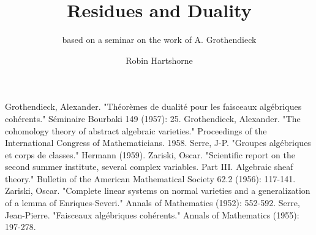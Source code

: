 \documentclass[graybox,envcountchap,sectrefs]{svmono}
\begin{document}
\author{Robin Hartshorne}
\title{Residues and Duality}
\subtitle{based on a seminar on the work of A. Grothendieck}
\maketitle

\frontmatter%

% 
% 

% 


\tableofcontents

% 


\mainmatter%
% 


% 
% 

\backmatter%

% 

\biblstarthook{}

\begin{thebibliography}{99.}%
%
%

 Grothendieck, Alexander. "Théorèmes de dualité pour les faisceaux algébriques cohérents." Séminaire Bourbaki 149 (1957): 25.
 Grothendieck, Alexander. "The cohomology theory of abstract algebraic varieties." Proceedings of the International Congress of Mathematicians. 1958.
 Serre, J-P. "Groupes algébriques et corps de classes." Hermann (1959).
 Zariski, Oscar. "Scientific report on the second summer institute, several complex variables. Part III. Algebraic sheaf theory." Bulletin of the American Mathematical Society 62.2 (1956): 117-141.
 Zariski, Oscar. "Complete linear systems on normal varieties and a generalization of a lemma of Enriques-Severi." Annals of Mathematics (1952): 552-592.
 Serre, Jean-Pierre. "Faisceaux algébriques cohérents." Annals of Mathematics (1955): 197-278.
\end{thebibliography}
\end{document}

